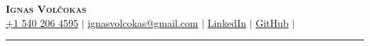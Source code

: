 \documentclass[letterpaper,11pt]{article}
\begin{document}

\begin{center}
    \textbf{\Huge \scshape Ignas Volčokas} \\ \vspace{5pt}
    \vspace{3pt}
    \small
    \faMobile \hspace{.5pt} \href{tel:+15402064595}{+1 540 206 4595}
    $|$
    \faAt \hspace{.5pt} \href{mailto:ignasvolcokas@gmail.com}{ignasvolcokas@gmail.com}
    $|$
    \faLinkedinSquare \hspace{.5pt} \href{https://www.linkedin.com/in/ignas-vol%C4%8Dokas-90a2701b4/}{LinkedIn}
    $|$
    \faGithub \hspace{.5pt} \href{https://github.com/Iggy-V}{GitHub}
    $|$
    
    \noindent\rule{8cm}{0.4pt}
\end{center}
\end{document}
